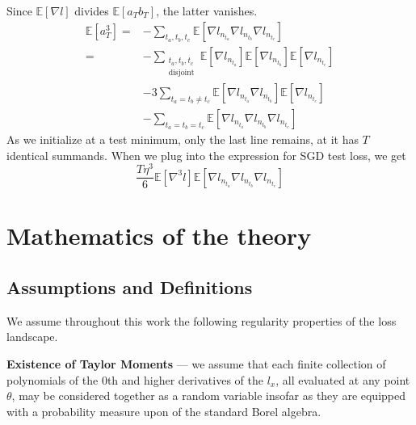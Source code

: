 \documentclass[openany, notitlepage, justified]{tufte-book}
\theoremstyle{plain}
\theoremstyle{definition}
\newcommand{\expct}[1]{\mathbb{E}\left[#1\right]}
\begin{document}
            \newpage
            \begin{shaded}
                Since $\expct{\nabla l}$ divides $\expct{a_T b_T}$, the latter
                vanishes.
                \begin{align*}
                    \expct{a_T^3}
                        =&- \sum_{t_a, t_b, t_c}
                                \expct{\nabla l_{n_{t_a}} \nabla l_{n_{t_b}} \nabla l_{n_{t_c}}}
                        \\
                        =&- \sum_{\substack{t_a, t_b, t_c\\ \text{disjoint}}}  
                                \expct{\nabla l_{n_{t_a}}} \expct{\nabla l_{n_{t_b}}} \expct{\nabla l_{n_{t_c}}}
                        \\&-3 \sum_{t_a=t_b\neq t_c}  
                                \expct{\nabla l_{n_{t_a}} \nabla l_{n_{t_b}}} \expct{\nabla l_{n_{t_c}}}
                        \\&-\sum_{t_a=t_b=t_c}  
                                \expct{\nabla l_{n_{t_a}} \nabla l_{n_{t_b}} \nabla l_{n_{t_c}}}
                \end{align*}
                As we initialize at a test minimum, only the last line remains, at
                it has $T$ identical summands.
                When we plug into the expression for SGD test loss, we get
                $$
                    \frac{T \eta^3 }{6}
                    \expct{\nabla^3 l}
                    \expct{\nabla l_{n_{t_a}} \nabla l_{n_{t_b}} \nabla l_{n_{t_c}}}
                $$
            \end{shaded}




\chapter{Mathematics of the theory}\label{appendix:math}
    \section{Assumptions and Definitions}                        \label{appendix:assumptions}
        We assume throughout this work the following regularity properties of
        the loss landscape.
        
        \textbf{Existence of Taylor Moments} --- we assume
        that each finite collection of polynomials of the $0$th and higher
        derivatives of the $l_x$, all evaluated at any point $\theta$, may be
        considered together as a random variable insofar as they are equipped
        with a probability measure upon of the standard Borel algebra.
\end{document}
